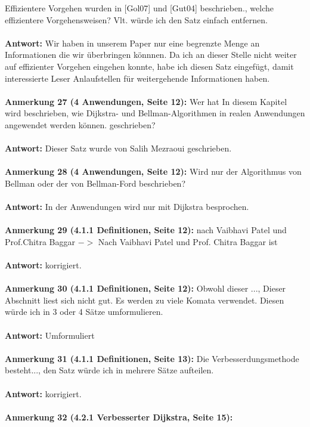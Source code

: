 \documentclass[a4paper,12pt]{book}
\begin{document}
\glqq Effizientere Vorgehen wurden in [Gol07] und [Gut04] beschrieben.\grqq, welche effizientere Vorgehensweisen? Vlt. würde ich den Satz einfach entfernen. 
\\ \\
\textbf{Antwort:}
Wir haben in unserem Paper nur eine begrenzte Menge an Informationen die wir überbringen könnnen. Da ich an dieser Stelle nicht weiter auf effizienter Vorgehen eingehen konnte, habe ich diesen Satz eingefügt, damit interessierte Leser Anlaufstellen für weitergehende Informationen haben.
\\ \\
\textbf{Anmerkung 27 (4 Anwendungen, Seite 12):}
Wer hat \glqq In diesem Kapitel wird beschrieben, wie Dijkstra- und Bellman-Algorithmen in realen Anwendungen angewendet werden können.\grqq{} geschrieben? 
 \\  \\
\textbf{Antwort:} Dieser Satz wurde von Salih Mezraoui geschrieben.
\\ \\
\textbf{Anmerkung 28 (4 Anwendungen, Seite 12):}
Wird nur der Algorithmus von Bellman oder der von Bellman-Ford beschrieben?
 \\  \\
\textbf{Antwort:} In der Anwendungen wird nur mit Dijkstra besprochen.
\\ \\
\textbf{Anmerkung 29 (4.1.1 Definitionen, Seite 12):}
nach Vaibhavi Patel und Prof.Chitra Baggar $->$ Nach Vaibhavi Patel und Prof. Chitra Baggar ist
 \\  \\
\textbf{Antwort:} korrigiert.
\\ \\
\textbf{Anmerkung 30 (4.1.1 Definitionen, Seite 12):}
\glqq Obwohl dieser ...\grqq, Dieser Abschnitt liest sich nicht gut. Es werden zu viele Komata verwendet. Diesen würde ich in 3 oder 4 Sätze umformulieren.   
\\  \\
\textbf{Antwort:} Umformuliert
\\ \\
\textbf{Anmerkung 31 (4.1.1 Definitionen, Seite 13):}
\glqq Die Verbesserdungsmethode besteht...\grqq, den Satz würde ich in mehrere Sätze aufteilen. 
 \\  \\
\textbf{Antwort:} korrigiert.
\\ \\
\textbf{Anmerkung 32 (4.2.1 Verbesserter Dijkstra, Seite 15):}
\end{document}
